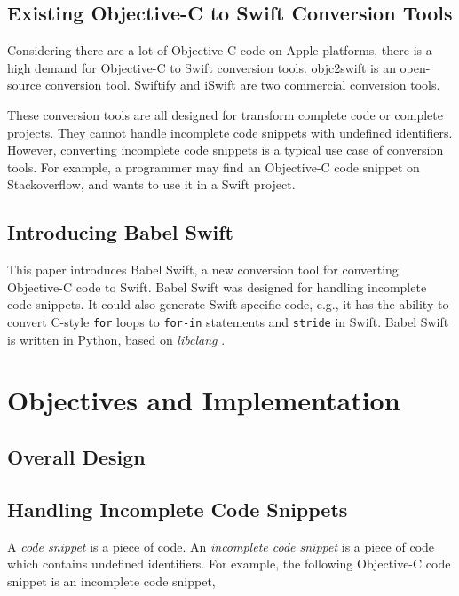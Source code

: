 \documentclass{sfuthesis}
\begin{document}
\section{Existing Objective-C to Swift Conversion Tools}

Considering there are a lot of Objective-C code on Apple platforms, there is a high demand for Objective-C to Swift conversion tools. objc2swift \cite{objc2swift} is an open-source conversion tool. Swiftify \cite{swiftify} and iSwift \cite{iswift} are two commercial conversion tools.

These conversion tools are all designed for transform complete code or complete projects. They cannot handle incomplete code snippets with undefined identifiers. However, converting incomplete code snippets is a typical use case of conversion tools. For example, a programmer may find an Objective-C code snippet on Stackoverflow, and wants to use it in a Swift project.

\section{Introducing Babel Swift}

This paper introduces Babel Swift, a new conversion tool for converting Objective-C code to Swift. Babel Swift was designed for handling incomplete code snippets. It could also generate Swift-specific code, e.g., it has the ability to convert C-style \texttt{for} loops to \texttt{for-in} statements and \texttt{stride} in Swift. Babel Swift is written in Python, based on \emph{libclang} \cite{libclang}.


\chapter{Objectives and Implementation}

\section{Overall Design}

\section{Handling Incomplete Code Snippets}

A \emph{code snippet} is a piece of code. An \emph{incomplete code snippet} is a piece of code which contains undefined identifiers. For example, the following Objective-C code snippet is an incomplete code snippet,
\end{document}
